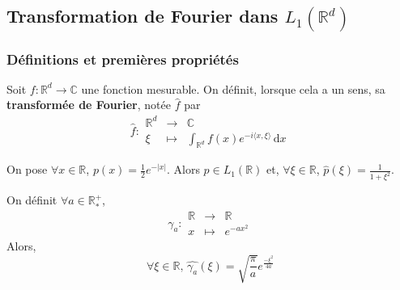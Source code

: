 




  \subsection{Transformation de Fourier dans \texorpdfstring{$L_1(\mathbb{R}^d)$}{L₁(Rᵈ)}}

  \subsubsection{Définitions et premières propriétés}


  \begin{definition}
    Soit $f : \mathbb{R}^d \rightarrow \mathbb{C}$ une fonction mesurable. On définit, lorsque cela a un sens, sa \textbf{transformée de Fourier}, notée $\widehat{f}$ par
    \[
    \widehat{f} :
    \begin{array}{ccc}
      \mathbb{R}^d &\rightarrow& \mathbb{C} \\
      \xi &\mapsto& \int_{\mathbb{R}^d} f(x) e^{-i\langle x, \xi \rangle} \, \mathrm{d}x
    \end{array}
    \]
  \end{definition}

  \begin{example}
    On pose $\forall x \in \mathbb{R}$, $p(x) = \frac{1}{2} e^{-|x|}$. Alors $p \in L_1(\mathbb{R})$ et, $\forall \xi \in \mathbb{R}$, $\widehat{p}(\xi) = \frac{1}{1+\xi^2}$.
  \end{example}


  \begin{example}
    \label{250-1}
    On définit $\forall a \in \mathbb{R}^+_*$,
    \[ \gamma_a :
    \begin{array}{ccc}
      \mathbb{R} &\rightarrow& \mathbb{R} \\
      x &\mapsto& e^{-ax^2}
    \end{array}
    \]
    Alors,
    \[ \forall \xi \in \mathbb{R}, \, \widehat{\gamma_a}(\xi) = \sqrt{\frac{\pi}{a}} e^{\frac{- \xi^2}{4a}} \]
  \end{example}


